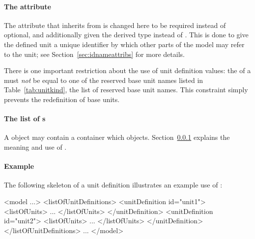 \begin{blockChanged}
{\paragraph{The  attribute}}

The  attribute that \UnitDefinition inherits from \SBase is changed here to be required instead of optional, and additionally given the derived type  instead of .  This is done to give the defined unit a unique identifier by which other parts of the model may refer to the unit; see Section~\ref{sec:idnameattribs} for more details.
\end{blockChanged}

There is one important restriction about the use of unit
definition  values: the  of a \UnitDefinition
must \emph{not} be equal to one of the reserved base unit
  names listed in Table~\ref{tab:unitkind}, the list of reserved
base unit names.  This constraint simply prevents the redefinition
of base units.


\paragraph{The list of s}
\label{sec:listofunits}

A \UnitDefinition object may contain a \ListOfUnits container which  \Unit objects. Section~\ref{sec:unit-structure} explains
the meaning and use of \Unit.   

\paragraph{Example}

The following skeleton of a unit definition illustrates an example
use of \UnitDefinition:

\begin{example}
<model ...>
    <listOfUnitDefinitions>
        <unitDefinition id="unit1">
            <listOfUnits>
                ...
            </listOfUnits>
        </unitDefinition>
        <unitDefinition id="unit2">
            <listOfUnits>
                ...
            </listOfUnits>
        </unitDefinition>
    </listOfUnitDefinitions>
    ...
</model>
\end{example}


\subsubsection{}
\label{sec:unit-structure}


